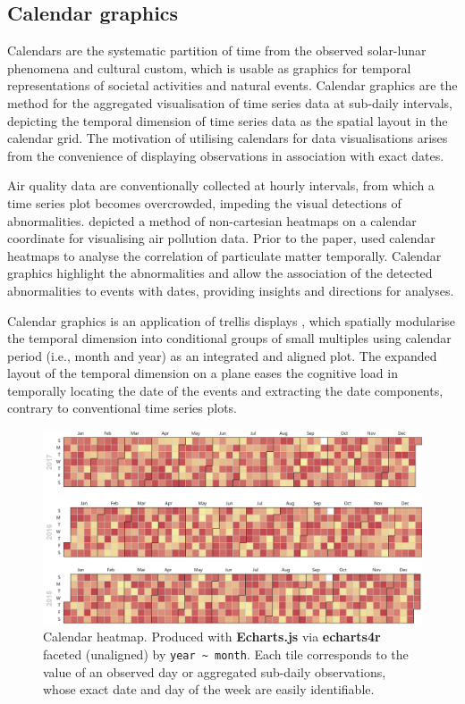 \documentclass{aucklandthesis}
\begin{document}
\hypertarget{calendar-graphics}{%
\subsection{Calendar graphics}\label{calendar-graphics}}

Calendars are the systematic partition of time from the observed solar-lunar phenomena and cultural custom, which is usable as graphics for temporal representations of societal activities and natural events. Calendar graphics are the method for the aggregated visualisation of time series data at sub-daily intervals, depicting the temporal dimension of time series data as the spatial layout in the calendar grid. The motivation of utilising calendars for data visualisations arises from the convenience of displaying observations in association with exact dates.

Air quality data are conventionally collected at hourly intervals, from which a time series plot becomes overcrowded, impeding the visual detections of abnormalities. \textcite{calmap} depicted a method of non-cartesian heatmaps on a calendar coordinate for visualising air pollution data. Prior to the paper, \textcite{calmapi} used calendar heatmaps to analyse the correlation of particulate matter temporally. Calendar graphics highlight the abnormalities and allow the association of the detected abnormalities to events with dates, providing insights and directions for analyses.

Calendar graphics is an application of trellis displays \autocite{trellis}, which spatially modularise the temporal dimension into conditional groups of small multiples \autocite{tufte} using calendar period (i.e., month and year) as an integrated and aligned plot. The expanded layout of the temporal dimension on a plane eases the cognitive load \autocite{tufte} in temporally locating the date of the events and extracting the date components, contrary to conventional time series plots.

\begin{figure}
\includegraphics[width=1\linewidth]{figures/cal-demo} \caption{Calendar heatmap. Produced with \textbf{Echarts.js} \autocite{echarts} via \textbf{echarts4r} \autocite{echarts4r} faceted (unaligned) by \texttt{year\ \textasciitilde{}\ month}. Each tile corresponds to the value of an observed day or aggregated sub-daily observations, whose exact date and day of the week are easily identifiable.}\label{fig:cal-demo}
\end{figure}
\end{document}

